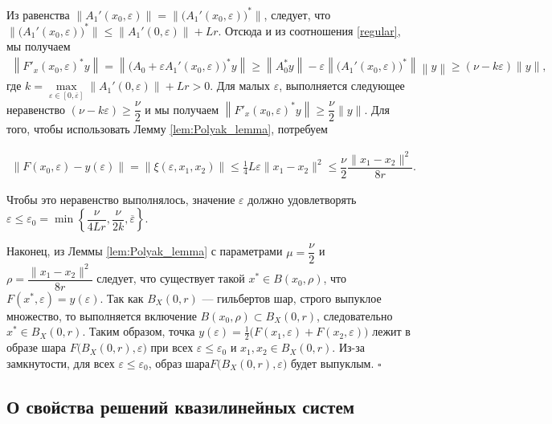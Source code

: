 \documentclass[../main.tex]{subfiles}
\begin{document}
Из равенства $\|A_1'(x_0,\varepsilon)\| = \|\big(A_1'(x_0,\varepsilon)\big)^*\| $, следует, что  $\|\big(A_1'(x_0,\varepsilon)\big)^*\| \leqslant \| A_1'(0,\varepsilon)\| + Lr$.
Отсюда и из соотношения \eqref{regular}, мы получаем 
\begin{gather*}
	\left\|F'_x(x_0, \varepsilon)^* y\right\| = \left\|\big(A_0 + \varepsilon A_1'(x_0, \varepsilon)\big)^* y\right\| \geqslant \left\|A_0^*y \right\| - \varepsilon \left\|\big(A_1'(x_0,\varepsilon)\big)^*\right\| \left\|y\right\| \geqslant (\nu - k\varepsilon)\|y\|,
\end{gather*} где $k = \max\limits_{\varepsilon \in [0,\overline{\varepsilon}]}\| A_1'(0,\varepsilon)\| + Lr > 0$.
Для малых $\varepsilon$, выполняется следующее неравенство $(\nu - k\varepsilon) \geqslant \dfrac{\nu}{2}$ и мы получаем $\left\|F'_x(x_0, \varepsilon)^* y\right\| \geqslant \dfrac{\nu}{2} \|y\|$. Для того, чтобы использовать Лемму  \ref{lem:Polyak_lemma}, потребуем

\begin{gather*}
	\| F(x_0,\varepsilon) - y(\varepsilon) \| = \|\xi(\varepsilon,x_1,x_2)\| \leqslant \frac{1}{4}L\varepsilon\|x_1-x_2\|^2 \leqslant \dfrac{\nu}{2} \dfrac{\|x_1-x_2\|^2}{8r}.
\end{gather*}

Чтобы это неравенство выполнялось, значение  $\varepsilon$ должно удовлетворять $\varepsilon \leqslant \varepsilon_0 = \min\left\{\dfrac{\nu}{4Lr}, \dfrac{\nu}{2k}, \overline{\varepsilon}\right\}$. 

Наконец, из Леммы \ref{lem:Polyak_lemma} с параметрами $\mu=\dfrac{\nu}{2}$ и $\rho=\dfrac{\|x_1-x_2\|^2}{8r}$ следует, что существует такой $x^*\in B(x_0, \rho)$, что $F(x^*,\varepsilon) = y(\varepsilon)$.
Так как $B_X(0, r)$ --- гильбертов шар, строго выпуклое множество, то выполняется включение $B(x_0, \rho) \subset B_X(0, r)$, следовательно $x^* \in B_X(0, r)$. Таким образом, точка $y(\varepsilon) = \frac{1}{2} \big( F(x_1,\varepsilon) + F(x_2,\varepsilon)\big)$ лежит в образе шара $F\big(B_X(0,r),\varepsilon\big) $  при  всех  $\varepsilon \leqslant \varepsilon_0$ и $x_1, x_2 \in B_X(0,r)$. Из-за замкнутости, для всех $\varepsilon \leqslant \varepsilon_0$, образ шара$F\big(B_X(0,r),\varepsilon\big) $ будет выпуклым.
\hfill$\square$\\[1ex]%

\subsection{О свойства решений квазилинейных систем}
\end{document}
